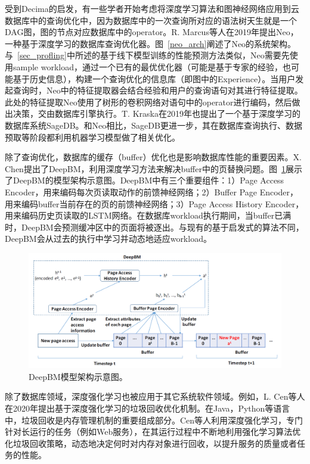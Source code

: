 受到Decima的启发，有一些学者开始考虑将深度学习算法和图神经网络应用到云数据库中的查询优化中，因为数据库中的一次查询所对应的语法树天生就是一个DAG图，图的节点对应数据库中的operator。R. Marcus等人在2019年提出Neo\parencite{marcus2019neo}，一种基于深度学习的数据库查询优化器。图~\ref{neo_arch}阐述了Neo的系统架构。与~\ref{sec_profling}中所述的基于线下模型训练的性能预测方法类似，Neo需要先使用sample workload，通过一个已有的最优优化器（可能是基于专家的经验，也可能基于历史信息），构建一个查询优化的信息库（即图中的Experience）。当用户发起查询时，Neo中的特征提取器会结合经验和用户的查询语句对其进行特征提取。此处的特征提取Neo使用了树形的卷积网络对语句中的operator进行编码，然后做出决策，交由数据库引擎执行。T. Kraska在2019年也提出了一个基于深度学习的数据库系统SageDB\parencite{47669}。和Neo相比，SageDB更进一步，其在数据库查询执行、数据预取等阶段都利用机器学习模型做了相关优化。

除了查询优化，数据库的缓存（buffer）优化也是影响数据库性能的重要因素。X. Chen提出了DeepBM，利用深度学习方法来解决buffer中的页替换问题。图~\ref{deepbm_arch}展示了DeepBM的模型架构示意图。DeepBM中有三个重要组件：1）Page Access Encoder，用来编码每次页读取动作的前馈神经网络；2）Buffer Page Encoder，用来编码buffer当前存在的页的前馈神经网络；3）Page Access History Encoder，用来编码历史页读取的LSTM网络。在数据库workload执行期间，当buffer已满时，DeepBM会预测缓冲区中的页面将被逐出。与现有的基于启发式的算法不同，DeepBM会从过去的执行中学习并动态地适应workload。

\begin{figure}[h]
    \centerline{\includegraphics[width=\textwidth]{figures/deepbm-arch.png}}
    \caption{DeepBM模型架构示意图。}
    \label{deepbm_arch}
\end{figure}

除了数据库领域，深度强化学习也被应用于其它系统软件领域。例如，L. Cen等人\parencite{cen2020learned}在2020年提出基于深度强化学习的垃圾回收优化机制。在Java，Python等语言中，垃圾回收是内存管理机制的重要组成部分。Cen等人利用深度强化学习，专门针对长运行的任务（例如Web服务），在其运行过程中不断地利用强化学习算法优化垃圾回收策略，动态地决定何时对内存对象进行回收，以提升服务的质量或者任务的性能。

